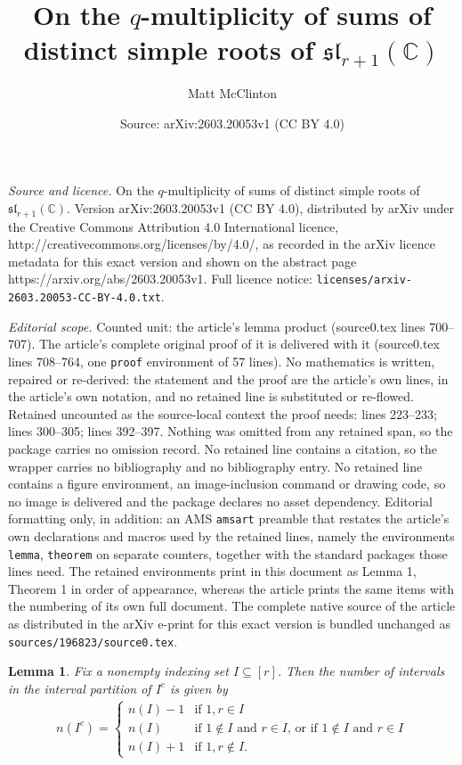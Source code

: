 \documentclass[10pt,a4paper]{amsart}
\title{On the $q$-multiplicity of sums of distinct simple roots of $\mathfrak{sl}_{r+1}(\mathbb{C})$}
\author{Matt McClinton}
\date{Source: arXiv:2603.20053v1 (CC BY 4.0)}
\newtheorem{lemma}{Lemma}
\begin{document}
\maketitle

\noindent\emph{Source and licence.} On the $q$-multiplicity of sums of distinct simple roots of $\mathfrak{sl}_{r+1}(\mathbb{C})$. Version arXiv:2603.20053v1 (CC BY 4.0), distributed by arXiv under the Creative Commons Attribution 4.0 International licence, http://creativecommons.org/licenses/by/4.0/, as recorded in the arXiv licence metadata for this exact version and shown on the abstract page https://arxiv.org/abs/2603.20053v1. Full licence notice: \texttt{licenses/arxiv-2603.20053-CC-BY-4.0.txt}.\par\smallskip

\noindent\textit{Editorial scope.} Counted unit: the article's lemma product (source0.tex lines 700--707). The article's complete original proof of it is delivered with it (source0.tex lines 708--764, one \texttt{proof} environment of 57 lines). No mathematics is written, repaired or re-derived: the statement and the proof are the article's own lines, in the article's own notation, and no retained line is substituted or re-flowed.  Retained uncounted as the source-local context the proof needs: lines 223--233; lines 300--305; lines 392--397.  Nothing was omitted from any retained span, so the package carries no omission record.  No retained line contains a citation, so the wrapper carries no bibliography and no bibliography entry.  No retained line contains a figure environment, an image-inclusion command or drawing code, so no image is delivered and the package declares no asset dependency.  Editorial formatting only, in addition: an AMS \texttt{amsart} preamble that restates the article's own declarations and macros used by the retained lines, namely the environments \texttt{lemma}, \texttt{theorem} on separate counters, together with the standard packages those lines need.  The retained environments print in this document as Lemma 1, Theorem 1 in order of appearance, whereas the article prints the same items with the numbering of its own full document.  The complete native source of the article as distributed in the arXiv e-print for this exact version is bundled unchanged as \texttt{sources/196823/source0.tex}.
\begin{lemma}\label{def:n(I^c)}
Fix a nonempty indexing set $I\subseteq[r]$.
Then the number of intervals in the interval partition of $I^c$ is given by 
\begin{align}
    n(I^c)=\begin{cases}
        n(I)-1 & \mbox{if $1,r\in I$} \\
        n(I) & \mbox{if $1\notin I$ and $r\in I$, or if $1\notin I$ and $r\in I$}\\
        n(I)+1 & \mbox{if $1,r\notin I$}.
    \end{cases}
\end{align}
\end{lemma}
\end{document}
